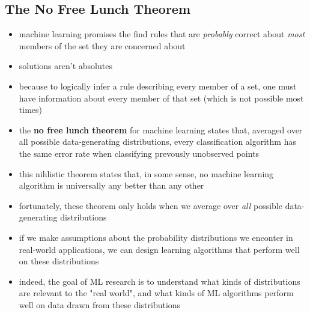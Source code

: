 \documentclass[11pt, twocolumn]{report}
\begin{document}
\subsection{The No Free Lunch Theorem}
\begin{itemize}
  \item machine learning promises the find rules that are \textit{probably}
    correct about \textit{most} members of the set they are concerned about
  \item solutions aren't absolutes 
  \item because to logically infer a rule describing every member of a set, one
    must have information about every member of that set (which is not possible
    most times)
  \item the \textbf{no free lunch theorem} for machine learning states that,
    averaged over all possible data-generating distributions, every
    classification algorithm has the same error rate when classifying prevously
    unobserved points
  \item this nihlistic theorem states that, in some sense, no machine learning
    algorithm is universally any better than any other
  \item fortunately, these theorem only holds when we average over \textit{all}
    possible data-generating distributions
  \item if we make assumptions about the probability distributions we enconter
    in real-world applications, we can design learning algorithms that perform
    well on these distributions
  \item indeed, the goal of ML research is to understand what kinds of
    distributions are relevant to the "real world", and what kinds of ML
    algorithms perform well on data drawn from these distributions
\end{itemize}
\end{document}
